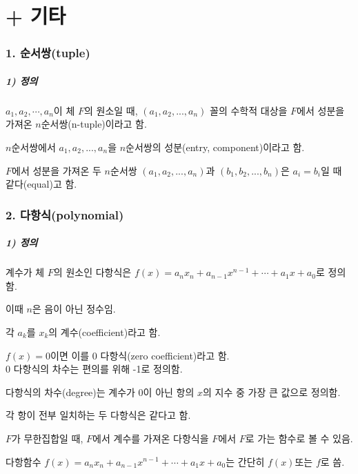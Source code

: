 \part*{+ 기타}

\section*{1. 순서쌍(tuple)}

\subsubsection*{1) 정의\\}
\begin{DEF}
$a_1,a_2,\cdots,a_n$이 체 $F$의 원소일 때, $(a_1,a_2, ... ,a_n)$ 꼴의 수학적 대상을 $F$에서 성분을 가져온 $n$순서쌍(n-tuple)이라고 함.

$n$순서쌍에서 $a_1,a_2, ... ,a_n$을 $n$순서쌍의 성분(entry, component)이라고 함.
\end{DEF}

$F$에서 성분을 가져온 두 $n$순서쌍 $(a_1,a_2, ... ,a_n)$과 $(b_1,b_2, ... ,b_n)$은 $a_i=b_i$일 때 같다(equal)고 함.

\section*{2. 다항식(polynomial)}
\subsubsection*{1) 정의\\}
\begin{DEF}
계수가 체 $F$의 원소인 다항식은 $f(x)=a_nx_n+a_{n-1}x^{n-1}+ \cdots +a_1x+a_0$로 정의함.

이때 $n$은 음이 아닌 정수임.

각 $a_k$를 $x_k$의 계수(coefficient)라고 함.
\end{DEF}

$f(x)=0$이면 이를 0 다항식(zero coefficient)라고 함.\\
0 다항식의 차수는 편의를 위해 -1로 정의함.

다항식의 차수(degree)는 계수가 0이 아닌 항의 $x$의 지수 중 가장 큰 값으로 정의함.

각 항이 전부 일치하는 두 다항식은 같다고 함.

$F$가 무한집합일 때, $F$에서 계수를 가져온 다항식을 $F$에서 $F$로 가는 함수로 볼 수 있음.

다항함수 $f(x)=a_nx_n+a_{n-1}x^{n-1}+ \cdots +a_1x+a_0$는 간단히 $f(x)$또는 $f$로 씀.

